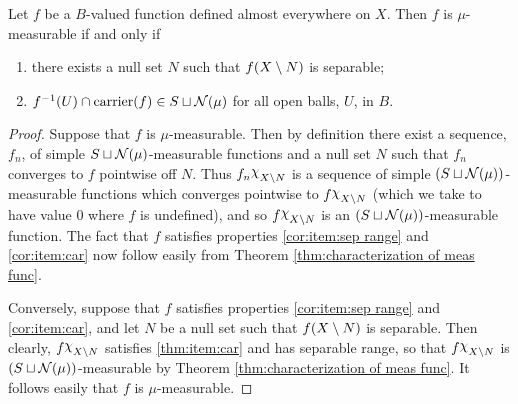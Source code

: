\begin{corollary}\label{cor:characterization of meas func}
Let $f$ be a $B$-valued function defined almost everywhere on $X$. Then $f$ is $\mu$-measurable if and only if
\begin{enumerate}[label=\arabic*),ref=\arabic*)]
    \item\label{cor:item:sep range}
    there exists a null set $N$ such that $f(X\setminus N)$ is separable;
    \item\label{cor:item:car}
    $f^{-1}(U)\cap\operatorname{carrier}(f)\in S\sqcup{\cal N}(\mu)$ for all open balls, $U$, in $B$.
\end{enumerate}
\end{corollary}
\begin{proof}
Suppose that $f$ is $\mu$-measurable. Then by definition there exist a sequence, $f_n$, of simple $S\sqcup{\cal N}(\mu)$-measurable functions and a null set $N$ such that $f_n$ converges to $f$ pointwise off $N$. Thus $f_n\idf{X\sd N}$ is a sequence of simple $(S\sqcup{\cal N}(\mu))$-measurable functions which converges pointwise to $f\idf{X\sd N}$ (which we take to have value 0 where $f$ is undefined), and so $f\idf{X\sd N}$ is an $(S\sqcup{\cal N}(\mu))$-measurable function. The fact that $f$ satisfies properties \ref{cor:item:sep range} and \ref{cor:item:car} now follow easily from Theorem \ref{thm:characterization of meas func}.

Conversely, suppose that $f$ satisfies properties \ref{cor:item:sep range} and \ref{cor:item:car}, and let $N$ be a null set such that $f(X\setminus N)$ is separable. Then clearly, $f\idf{X\sd N}$ satisfies \ref{thm:item:car} and has separable range, so that $f\idf{X\sd N}$ is $(S\sqcup{\cal N}(\mu))$-measurable by Theorem \ref{thm:characterization of meas func}. It follows easily that $f$ is $\mu$-measurable.
\end{proof}

